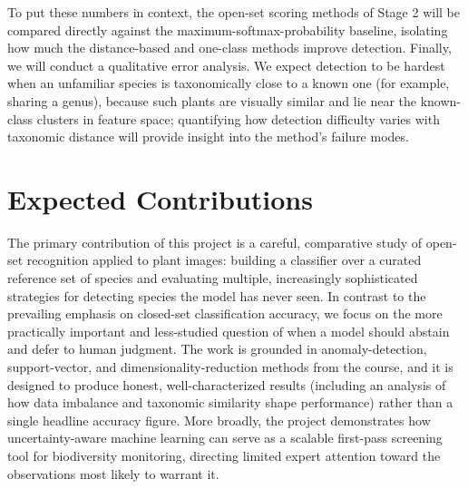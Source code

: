 \documentclass[11pt]{article}
\begin{document}
To put these numbers in context, the open-set scoring methods of Stage 2 will be compared directly against the maximum-softmax-probability baseline, isolating how much the distance-based and one-class methods improve detection. Finally, we will conduct a qualitative error analysis. We expect detection to be hardest when an unfamiliar species is taxonomically close to a known one (for example, sharing a genus), because such plants are visually similar and lie near the known-class clusters in feature space; quantifying how detection difficulty varies with taxonomic distance will provide insight into the method's failure modes.

\section{Expected Contributions}

The primary contribution of this project is a careful, comparative study of open-set recognition applied to plant images: building a classifier over a curated reference set of species and evaluating multiple, increasingly sophisticated strategies for detecting species the model has never seen. In contrast to the prevailing emphasis on closed-set classification accuracy, we focus on the more practically important and less-studied question of when a model should abstain and defer to human judgment. The work is grounded in anomaly-detection, support-vector, and dimensionality-reduction methods from the course, and it is designed to produce honest, well-characterized results (including an analysis of how data imbalance and taxonomic similarity shape performance) rather than a single headline accuracy figure. More broadly, the project demonstrates how uncertainty-aware machine learning can serve as a scalable first-pass screening tool for biodiversity monitoring, directing limited expert attention toward the observations most likely to warrant it.
\end{document}
